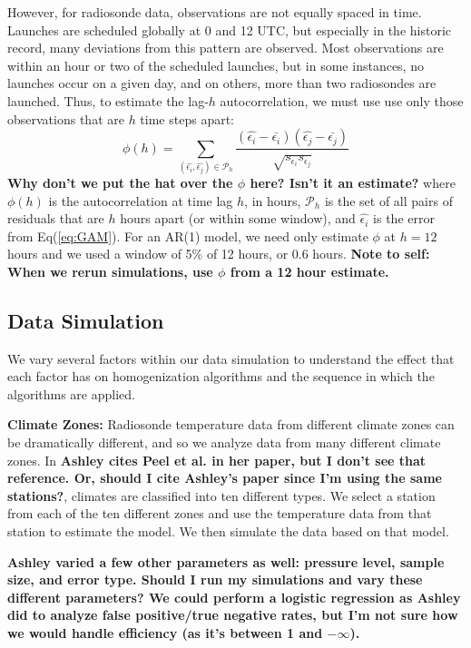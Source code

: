 \documentclass[12pt]{article}
\def\ni{\noindent}
\begin{document}
\begin{doublespacing}
However, for radiosonde data, observations are not equally spaced in time.  Launches are scheduled globally at 0 and 12 UTC, but especially in the historic record, many deviations from this pattern are observed.  Most observations are within an hour or two of the scheduled launches, but in some instances, no launches occur on a given day, and on others, more than two radiosondes are launched.   Thus, to estimate the lag-$h$  autocorrelation, we must use  use only those observations that are $h$ time steps apart:
\begin{equation} \label{eq:ACF}
	\phi(h)=\sum_{(\widehat{\epsilon_i},\widehat{\epsilon_j}) \in \mathcal{P}_h} \frac{(\widehat{\epsilon_i}-\bar{\epsilon_i})(\widehat{\epsilon_j}-\bar{\epsilon_j})}{\sqrt{s_{\epsilon_i} s_{\epsilon_j}}}
\end{equation}
\textbf{Why don't we put the hat over the $\phi$ here?  Isn't it an estimate?}
\ni where $\phi(h)$ is the autocorrelation at time lag $h$, in hours, $\mathcal{P}_h$ is the set of all pairs of residuals that are $h$ hours apart (or within some window), and $\widehat{\epsilon_i}$ is the error from Eq(\ref{eq:GAM}).  For an AR(1) model, we need only estimate $\phi$ at $h=12$ hours and we used a window of 5\% of 12 hours, or 0.6 hours.  \textbf{Note to self: When we rerun simulations, use $\phi$ from a 12 hour estimate.}

\subsection{Data Simulation}
\label{ssec:sim}

We vary several factors within our data simulation to understand the effect that each factor has on homogenization algorithms and the sequence in which the algorithms are applied.

\textbf{Climate Zones:} Radiosonde temperature data from different climate zones can be dramatically different, and so we analyze data from many different climate zones.  In \cite{peel??}\textbf{Ashley cites Peel et al. in her paper, but I don't see that reference.  Or, should I cite Ashley's paper since I'm using the same stations?}, climates are classified into ten different types.  We select a station from each of the ten different zones and use the temperature data from that station to estimate the model.  We then simulate the data based on that model.

\textbf{Ashley varied a few other parameters as well: pressure level, sample size, and error type.  Should I run my simulations and vary these different parameters?  We could perform a logistic regression as Ashley did to analyze false positive/true negative rates, but I'm not sure how we would handle efficiency (as it's between 1 and $-\infty$).}


\end{doublespacing}
\end{document}
